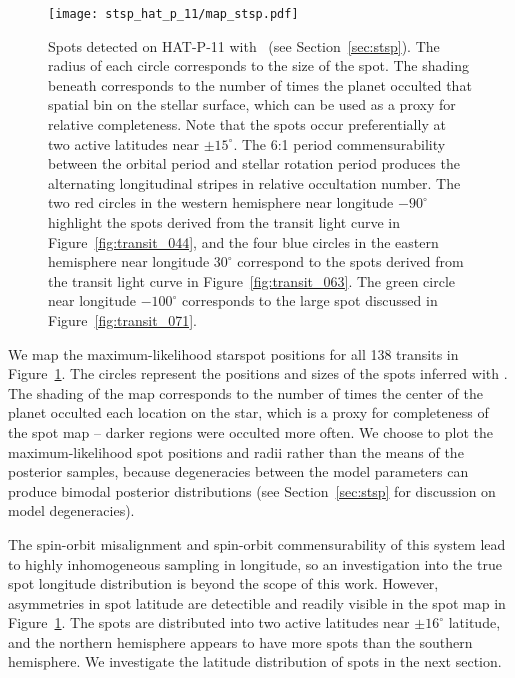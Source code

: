 \begin{figure}
\centering
\texttt{[image: stsp\_hat\_p\_11/map\_stsp.pdf]}
\caption{Spots detected on HAT-P-11 with \stsp\ (see Section~\ref{sec:stsp}). The radius of each circle corresponds to the size of the spot. The shading beneath corresponds to the number of times the planet occulted that spatial bin on the stellar surface, which can be used as a proxy for relative completeness. Note that the spots occur preferentially at two active latitudes near $\pm15^\circ$. The 6:1 period commensurability between the orbital period and stellar rotation period produces the alternating longitudinal stripes in relative occultation number. The two red circles in the western hemisphere near longitude $-90^\circ$ highlight the spots derived from the transit light curve in Figure~\ref{fig:transit_044}, and the four blue circles in the eastern hemisphere near longitude $30^\circ$ correspond to the spots derived from the transit light curve in Figure~\ref{fig:transit_063}. The green circle near longitude $-100^\circ$ corresponds to the large spot discussed in Figure~\ref{fig:transit_071}.}
\label{fig:map}
\end{figure}

We map the maximum-likelihood starspot positions for all 138 transits in Figure~\ref{fig:map}. The circles represent the positions and sizes of the spots inferred with \stsp. The shading of the map corresponds to the number of times the center of the planet occulted each location on the star, which is a proxy for completeness of the spot map -- darker regions were occulted more often. We choose to plot the maximum-likelihood spot positions and radii rather than the means of the posterior samples, because degeneracies between the model parameters can produce bimodal posterior distributions (see Section~\ref{sec:stsp} for discussion on model degeneracies).

The spin-orbit misalignment and spin-orbit commensurability of this system lead to highly inhomogeneous sampling in longitude, so an investigation into the true spot longitude distribution is beyond the scope of this work. However, asymmetries in spot latitude are detectible and readily visible in the spot map in Figure~\ref{fig:map}. The spots are distributed into two active latitudes near $\pm 16^\circ$ latitude, and the northern hemisphere appears to have more spots than the southern hemisphere. We investigate the latitude distribution of spots in the next section.

